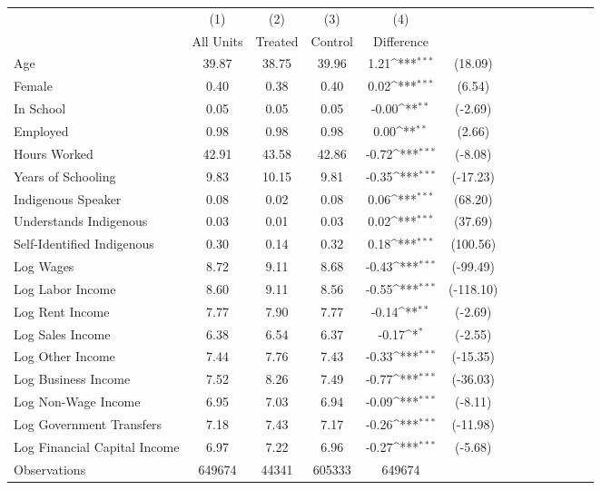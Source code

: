 {
\def\sym#1{\ifmmode^{#1}\else\(^{#1}\)\fi}
\begin{tabular}{l*{4}{ccc}}
\hline\hline
                    &\multicolumn{1}{c}{(1)}&\multicolumn{1}{c}{(2)}&\multicolumn{1}{c}{(3)}&\multicolumn{1}{c}{(4)}         &            \\
                    &   All Units&     Treated&     Control&  Difference         &            \\
\hline
Age                 &       39.87&       38.75&       39.96&        1.21\sym{***}&     (18.09)\\
Female              &        0.40&        0.38&        0.40&        0.02\sym{***}&      (6.54)\\
In School           &        0.05&        0.05&        0.05&       -0.00\sym{**} &     (-2.69)\\
Employed            &        0.98&        0.98&        0.98&        0.00\sym{**} &      (2.66)\\
Hours Worked        &       42.91&       43.58&       42.86&       -0.72\sym{***}&     (-8.08)\\
Years of Schooling  &        9.83&       10.15&        9.81&       -0.35\sym{***}&    (-17.23)\\
Indigenous Speaker  &        0.08&        0.02&        0.08&        0.06\sym{***}&     (68.20)\\
Understands Indigenous&        0.03&        0.01&        0.03&        0.02\sym{***}&     (37.69)\\
Self-Identified Indigenous&        0.30&        0.14&        0.32&        0.18\sym{***}&    (100.56)\\
Log Wages           &        8.72&        9.11&        8.68&       -0.43\sym{***}&    (-99.49)\\
Log Labor Income    &        8.60&        9.11&        8.56&       -0.55\sym{***}&   (-118.10)\\
Log Rent Income     &        7.77&        7.90&        7.77&       -0.14\sym{**} &     (-2.69)\\
Log Sales Income    &        6.38&        6.54&        6.37&       -0.17\sym{*}  &     (-2.55)\\
Log Other Income    &        7.44&        7.76&        7.43&       -0.33\sym{***}&    (-15.35)\\
Log Business Income &        7.52&        8.26&        7.49&       -0.77\sym{***}&    (-36.03)\\
Log Non-Wage Income &        6.95&        7.03&        6.94&       -0.09\sym{***}&     (-8.11)\\
Log Government Transfers&        7.18&        7.43&        7.17&       -0.26\sym{***}&    (-11.98)\\
Log Financial Capital Income&        6.97&        7.22&        6.96&       -0.27\sym{***}&     (-5.68)\\
\hline
Observations        &      649674&       44341&      605333&      649674         &            \\
\hline\hline
\end{tabular}
}
